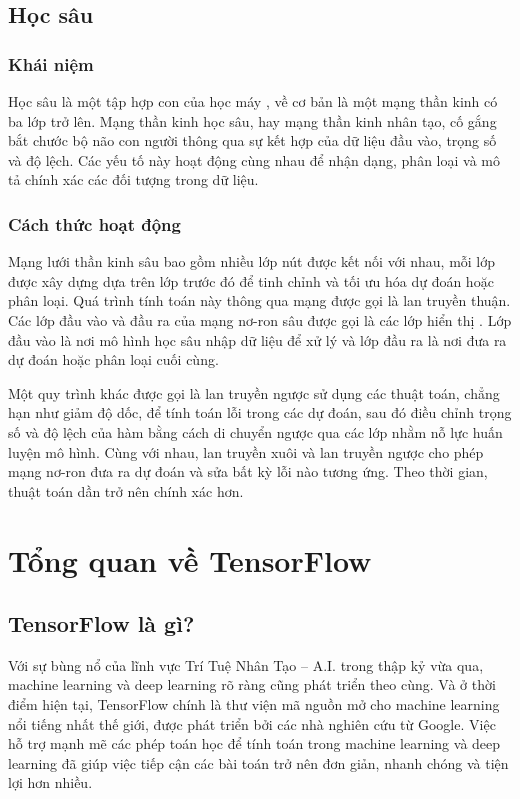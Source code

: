 \subsection{Học sâu}
\subsubsection*{Khái niệm}
Học sâu là một tập hợp con của  học máy , về cơ bản là một mạng thần kinh có ba lớp trở lên.
Mạng thần kinh học sâu, hay mạng thần kinh nhân tạo, cố gắng bắt chước bộ não con người thông qua sự kết hợp của dữ liệu đầu vào, trọng số và độ lệch. Các yếu tố này hoạt động cùng nhau để nhận dạng, 
phân loại và mô tả chính xác các đối tượng trong dữ liệu.

\subsubsection*{Cách thức hoạt động}
Mạng lưới thần kinh sâu bao gồm nhiều lớp nút được kết nối với nhau, mỗi lớp được xây dựng dựa trên lớp trước đó để tinh chỉnh và tối ưu hóa dự đoán hoặc phân loại. Quá trình tính toán này thông qua 
mạng được gọi là lan truyền thuận. Các lớp đầu vào và đầu ra của mạng nơ-ron sâu được gọi là  các lớp hiển thị  . Lớp đầu vào là nơi mô hình học sâu nhập dữ liệu để xử lý và lớp đầu ra là nơi đưa ra dự đoán hoặc phân loại cuối cùng.

Một quy trình khác được gọi là lan truyền ngược  sử dụng các thuật toán, chẳng hạn như giảm độ dốc, để tính toán lỗi trong các dự đoán, sau đó điều chỉnh trọng số và độ lệch của hàm bằng cách di chuyển ngược qua các lớp nhằm nỗ lực 
huấn luyện mô hình. Cùng với nhau, lan truyền xuôi và lan truyền ngược cho phép mạng nơ-ron đưa ra dự đoán và sửa bất kỳ lỗi nào tương ứng. Theo thời gian, thuật toán dần trở nên chính xác hơn.

\section{Tổng quan về TensorFlow}

\subsection{TensorFlow là gì?}
Với sự bùng nổ của lĩnh vực Trí Tuệ Nhân Tạo – A.I. trong thập kỷ vừa qua, machine learning và deep learning rõ ràng cũng phát triển theo cùng. 
Và ở thời điểm hiện tại, TensorFlow chính là thư viện mã nguồn mở cho machine learning nổi tiếng nhất thế giới, được phát triển bởi các nhà nghiên 
cứu từ Google. Việc hỗ trợ mạnh mẽ các phép toán học để tính toán trong machine learning và deep learning đã giúp việc tiếp cận các bài toán trở 
nên đơn giản, nhanh chóng và tiện lợi hơn nhiều. 

